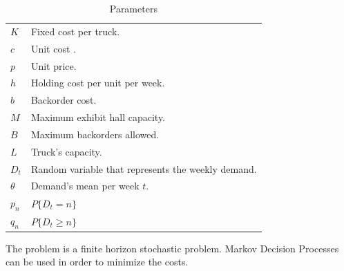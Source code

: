 \documentclass[11pt]{article}
\begin{document}
\begin{table}[ht]
\begin{center}
\begin{tabular}{ll}
$K$ & Fixed cost per truck.\\
$c$ & Unit cost .\\
$p$ & Unit price.\\
$h$ & Holding cost per unit per week.\\
$b$ & Backorder cost.\\
$M$ & Maximum exhibit hall capacity.\\
$B$ & Maximum backorders allowed.\\
$L$ & Truck's capacity.\\
$D_t$ & Random variable that represents the weekly demand.\\
$\theta$ & Demand's mean per week $t$.\\
$p_n$ & $P\{D_t = n\}$\\
$q_n$ & $P\{D_t \geq n\}$
\end{tabular}
\caption[\textbf{Parameters:}]{Parameters}
\label{tab:parameters3}
\end{center}
\end{table}

The problem is a finite horizon stochastic problem. Markov Decision Processes can be used in order to minimize the costs.
\end{document}
